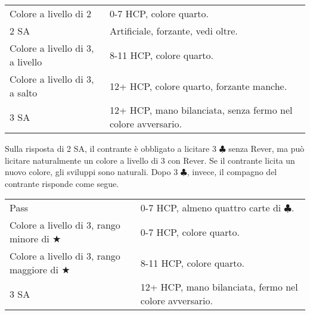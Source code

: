 \documentclass[a4paper,10pt]{article}
\renewcommand{\c}{$\clubsuit$\xspace}
\renewcommand{\j}{$\bigstar$\xspace}
\newcommand{\sa}{SA\xspace}
\newcommand{\smallspace}{\vskip0.3cm}
\newenvironment{twocol}
  {\smallspace\noindent\begin{tabular}{l p{0.78\textwidth}}}
  {\end{tabular}\smallspace}
\begin{document}
\begin{twocol}
	Colore a livello di 2 & 0-7 HCP, colore quarto. \\
	2 \sa & Artificiale, forzante, vedi oltre. \\
	Colore a livello di 3, a livello & 8-11 HCP, colore quarto. \\
	Colore a livello di 3, a salto & 12+ HCP, colore quarto, forzante manche. \\
	3 \sa & 12+ HCP, mano bilanciata, senza fermo nel colore avversario.
\end{twocol}

Sulla risposta di 2 \sa, il contrante è obbligato a licitare 3 \c senza Rever, ma può licitare naturalmente un colore a livello di 3 con Rever. Se il contrante licita un nuovo colore, gli sviluppi sono naturali. Dopo 3 \c, invece, il compagno del contrante risponde come segue.

\begin{twocol}
	Pass & 0-7 HCP, almeno quattro carte di \c. \\
	Colore a livello di 3, rango minore di \j & 0-7 HCP, colore quarto. \\
	Colore a livello di 3, rango maggiore di \j & 8-11 HCP, colore quarto. \\
	3 \sa & 12+ HCP, mano bilanciata, fermo nel colore avversario.
\end{twocol}
\end{document}

